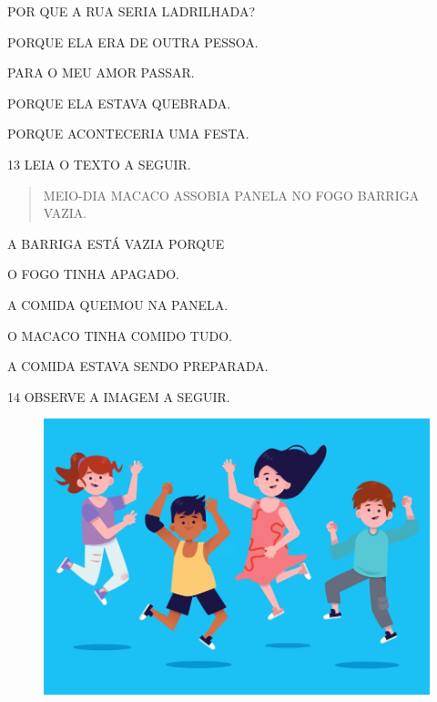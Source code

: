 POR QUE A RUA SERIA LADRILHADA?

\begin{escolha}

\item PORQUE ELA ERA DE OUTRA PESSOA.

\item PARA O MEU AMOR PASSAR.

\item PORQUE ELA ESTAVA QUEBRADA.

\item PORQUE ACONTECERIA UMA FESTA.

\end{escolha}

\num{13} LEIA O TEXTO A SEGUIR.

\begin{myquote}
\begin{verse}
MEIO-DIA
MACACO ASSOBIA
PANELA NO FOGO
BARRIGA VAZIA.
\end{verse}
\end{myquote}

A BARRIGA ESTÁ VAZIA PORQUE

\begin{escolha}

\item O FOGO TINHA APAGADO.

\item A COMIDA QUEIMOU NA PANELA.

\item O MACACO TINHA COMIDO TUDO.

\item A COMIDA ESTAVA SENDO PREPARADA.

\end{escolha}

\pagebreak
\num{14} OBSERVE A IMAGEM A SEGUIR.

\begin{figure}[H]
\centering
\includegraphics[width=.5\textwidth]{./media/image219.png}
\end{figure}

